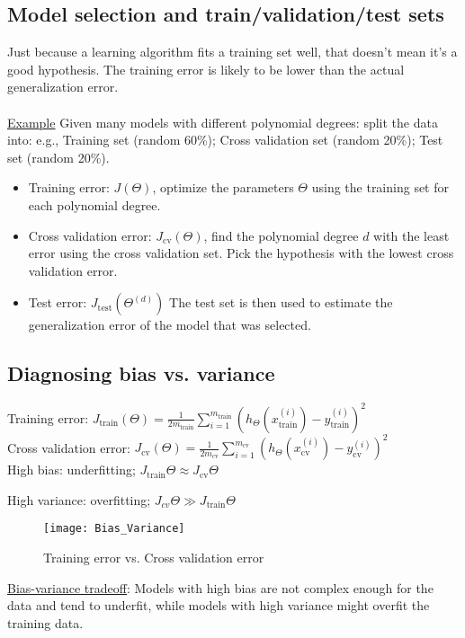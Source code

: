 \subsection{Model selection and train/validation/test sets}
Just because a learning algorithm fits a training set well, that doesn't mean it's a good hypothesis. The training error is likely to be lower than the actual generalization error.
\\\\
\underline{Example} Given many models with different polynomial degrees:
split the data into: e.g., Training set (random 60\%); Cross validation set (random 20\%); Test set (random 20\%).
\begin{itemize}
\item
Training error: $J(\Theta)$, optimize the parameters $\Theta$ using the training set for each polynomial degree.
\item
Cross validation error: $J_{\text{cv}}(\Theta)$, find the polynomial degree $d$ with the least error using the cross validation set. Pick the hypothesis with the lowest cross validation error. 
\item
Test error: $J_{\text{test}}(\Theta^{(d)})$
The test set is then used to estimate the generalization error of the model that was selected.
\end{itemize}

% 
\subsection{Diagnosing bias vs. variance}
Training error: $J_{\text{train}}(\Theta) = \frac{1}{2m_{\text{train}}} \sum_{i=1}^{m_{\text{train}}}(h_\Theta(x_{\text{train}}^{(i)}) - y_{\text{train}}^{(i)})^{2}$\\
Cross validation error: $J_{\text{cv}}(\Theta) = \frac{1}{2m_{\text{cv}}} \sum_{i=1}^{m_{\text{cv}}}(h_\Theta(x_{\text{cv}}^{(i)}) - y_{\text{cv}}^{(i)})^{2}$\\

High bias: underfitting; $J_{\text{train}}{\Theta} \approx J_{\text{cv}}{\Theta}$

High variance: overfitting; $J_{cv}{\Theta} \gg J_{\text{train}}{\Theta}$\\

\begin{figure}[h]
\centering
\texttt{[image: Bias\_Variance]}
\caption{Training error vs. Cross validation error}
\label{fig:BiasvsVariance}
\end{figure}
\underline{Bias-variance tradeoff}: Models with high bias are not complex enough for the data and tend to underfit, while models with high variance might overfit the training data.

